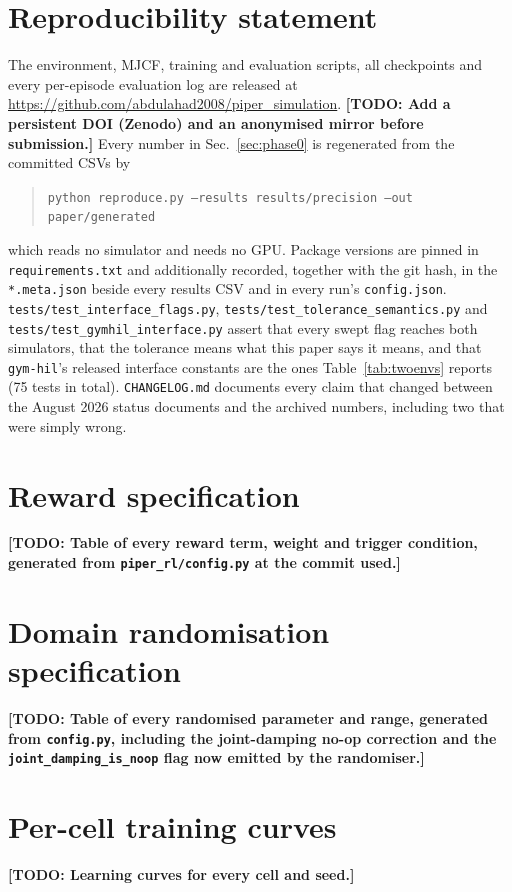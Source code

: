 \documentclass{article}
\newcommand{\todo}[1]{{\color{red}\textbf{[TODO: #1]}}}
\begin{document}
\section*{Reproducibility statement}
The environment, MJCF, training and evaluation scripts, all checkpoints and
every per-episode evaluation log are released at
\url{https://github.com/abdulahad2008/piper_simulation}. \todo{Add a persistent
DOI (Zenodo) and an anonymised mirror before submission.} Every number in
Sec.~\ref{sec:phase0} is regenerated from the committed CSVs by
\begin{quote}\small\texttt{python reproduce.py --results results/precision --out paper/generated}\end{quote}
which reads no simulator and needs no GPU. Package versions are pinned in
\texttt{requirements.txt} and additionally recorded, together with the git hash,
in the \texttt{*.meta.json} beside every results CSV and in every run's
\texttt{config.json}. \texttt{tests/test\_interface\_flags.py},
\texttt{tests/test\_tolerance\_semantics.py} and
\texttt{tests/test\_gymhil\_interface.py} assert that every swept flag reaches
both simulators, that the tolerance means what this paper says it means, and
that \texttt{gym-hil}'s released interface constants are the ones
Table~\ref{tab:twoenvs} reports (75 tests in total). \texttt{CHANGELOG.md} documents every claim that changed between the
August 2026 status documents and the archived numbers, including two that were
simply wrong.




\appendix
\section{Reward specification}
\todo{Table of every reward term, weight and trigger condition, generated from
\texttt{piper\_rl/config.py} at the commit used.}

\section{Domain randomisation specification}
\todo{Table of every randomised parameter and range, generated from
\texttt{config.py}, including the joint-damping no-op correction and the
\texttt{joint\_damping\_is\_noop} flag now emitted by the randomiser.}

\section{Per-cell training curves}
\todo{Learning curves for every cell and seed.}
\end{document}
